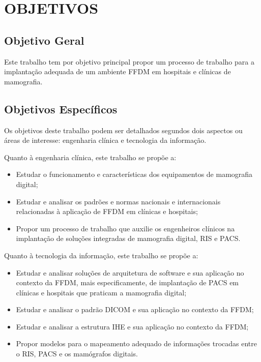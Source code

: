 \section[OBJETIVOS]{OBJETIVOS}

\subsection[Objetivo Geral]{\textbf{Objetivo Geral}}
Este trabalho tem por objetivo principal propor um processo de trabalho para a
implantação adequada de um ambiente FFDM em hospitais e clínicas de mamografia.
\subsection[Objetivo Específicos]{\textbf{Objetivos Específicos}}
Os objetivos deste trabalho podem ser detalhados segundos dois aspectos ou áreas de
interesse: engenharia clínica e tecnologia da informação.

Quanto à engenharia clínica, este trabalho se propõe a:
\begin{itemize}
 \item Estudar o funcionamento e características dos equipamentos de mamografia digital;
 \item Estudar e analisar os padrões e normas nacionais e internacionais relacionadas à aplicação de FFDM em clínicas e hospitais;
 \item Propor um processo de trabalho que auxilie os engenheiros clínicos na implantação de soluções integradas de mamografia digital, RIS e PACS.
\end{itemize}

Quanto à tecnologia da informação, este trabalho se propõe a:
\begin{itemize}
 \item Estudar e analisar soluções de arquitetura de software e sua aplicação no contexto
da FFDM, mais especificamente, de implantação de PACS em clínicas e hospitais
que praticam a mamografia digital;
\item Estudar e analisar o padrão DICOM e sua aplicação no contexto da FFDM;
\item Estudar e analisar a estrutura IHE e sua aplicação no contexto da FFDM;
\item Propor modelos para o mapeamento adequado de informações trocadas entre o RIS,
PACS e os mamógrafos digitais.

\end{itemize}
